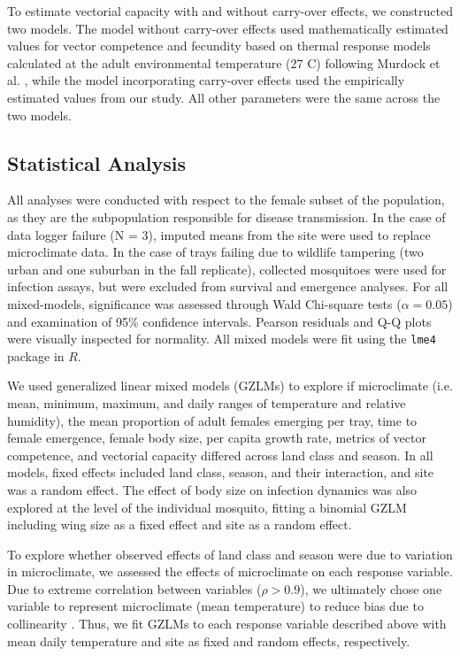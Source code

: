 \documentclass[12pt]{article}
\begin{document}
To estimate vectorial capacity with and without carry-over effects, we constructed two models. The model without carry-over effects used mathematically estimated values for vector competence and fecundity based on thermal response models calculated at the adult environmental temperature (27 \degree C) following Murdock et al. \citep{mordecai2017}, while the model incorporating carry-over effects used the empirically estimated values from our study. All other parameters were the same across the two models.

\subsection{Statistical Analysis}

All analyses were conducted with respect to the female subset of the population, as they are the subpopulation responsible for disease transmission. In the case of data logger failure (N = 3), imputed means from the site were used to replace microclimate data. In the case of trays failing due to wildlife tampering (two urban and one suburban in the fall replicate), collected mosquitoes were used for infection assays, but were excluded from survival and emergence analyses. For all mixed-models, significance was assessed through Wald Chi-square tests ($\alpha=0.05$) and examination of 95\% confidence intervals. Pearson residuals and Q-Q plots were visually inspected for normality. All mixed models were fit using the \texttt{lme4} package in $R$.

We used generalized linear mixed models (GZLMs) to explore if microclimate (i.e. mean, minimum, maximum, and daily ranges of temperature and relative humidity), the mean proportion of adult females emerging per tray, time to female emergence, female body size, per capita growth rate, metrics of vector competence, and vectorial capacity differed across land class and season. In all models, fixed effects included land class, season, and their interaction, and site was a random effect. The effect of body size on infection dynamics was also explored at the level of the individual mosquito, fitting a binomial GZLM including wing size as a fixed effect and site as a random effect.

To explore whether observed effects of land class and season were due to variation in microclimate, we assessed the effects of microclimate on each response variable. Due to extreme correlation between variables ($\rho>0.9$), we ultimately chose one variable to represent microclimate (mean temperature) to reduce bias due to collinearity \citep{graham2003}. Thus, we fit GZLMs to each response variable described above with mean daily temperature and site as fixed and random effects, respectively.
\end{document}
